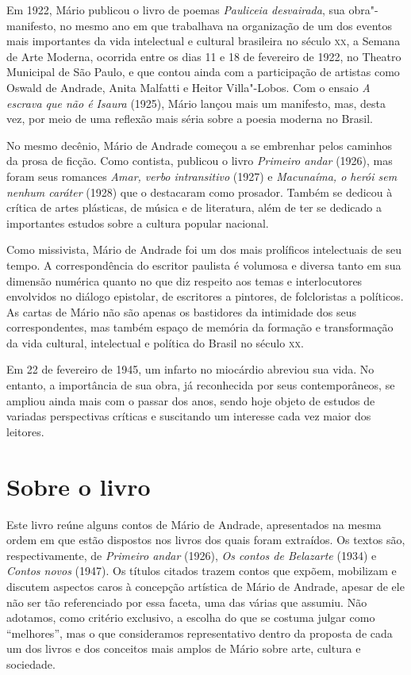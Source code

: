 Em 1922, Mário publicou o livro de poemas \emph{Pauliceia desvairada},
sua obra"-manifesto, no mesmo ano em que trabalhava na organização de um
dos eventos mais importantes da vida intelectual e cultural brasileira
no século \textsc{xx}, a Semana de Arte Moderna, ocorrida entre os dias 11 e 18
de fevereiro de 1922, no Theatro Municipal de São Paulo, e que contou
ainda com a participação de artistas como Oswald de Andrade, Anita
Malfatti e Heitor Villa"-Lobos. Com o ensaio \emph{A escrava que não é
Isaura} (1925), Mário lançou mais um manifesto, mas, desta vez, por meio
de uma reflexão mais séria sobre a poesia moderna no Brasil.

No mesmo decênio, Mário de Andrade começou a se embrenhar pelos caminhos
da prosa de ficção. Como contista, publicou o livro \emph{Primeiro
andar} (1926), mas foram seus romances \emph{Amar, verbo intransitivo}
(1927) e \emph{Macunaíma, o herói sem nenhum caráter} (1928) que o
destacaram como prosador. Também se dedicou à crítica de artes
plásticas, de música e de literatura, além de ter se dedicado a
importantes estudos sobre a cultura popular nacional.

Como missivista, Mário de Andrade foi um dos mais prolíficos
intelectuais de seu tempo. A correspondência do escritor paulista é
volumosa e diversa tanto em sua dimensão numérica quanto no que diz
respeito aos temas e interlocutores envolvidos no diálogo epistolar, de
escritores a pintores, de folcloristas a políticos. As cartas de Mário
não são apenas os bastidores da intimidade dos seus correspondentes, mas
também espaço de memória da formação e transformação da vida cultural,
intelectual e política do Brasil no século \textsc{xx}.

Em 22 de fevereiro de 1945, um infarto no miocárdio abreviou sua vida.
No entanto, a importância de sua obra, já reconhecida por seus
contemporâneos, se ampliou ainda mais com o passar dos anos, sendo hoje
objeto de estudos de variadas perspectivas críticas e suscitando um
interesse cada vez maior dos leitores.

\section{Sobre o livro}

Este livro reúne alguns contos de Mário de Andrade, apresentados na
mesma ordem em que estão dispostos nos livros dos quais foram extraídos.
Os textos são, respectivamente, de \emph{Primeiro andar} (1926),
\emph{Os contos de Belazarte} (1934) e \emph{Contos novos} (1947). Os
títulos citados trazem contos que expõem, mobilizam e discutem aspectos
caros à concepção artística de Mário de Andrade, apesar de ele não ser
tão referenciado por essa faceta, uma das várias que assumiu. Não
adotamos, como critério exclusivo, a escolha do que se costuma julgar
como ``melhores'', mas o que consideramos representativo dentro da
proposta de cada um dos livros e dos conceitos mais amplos de Mário
sobre arte, cultura e sociedade.

